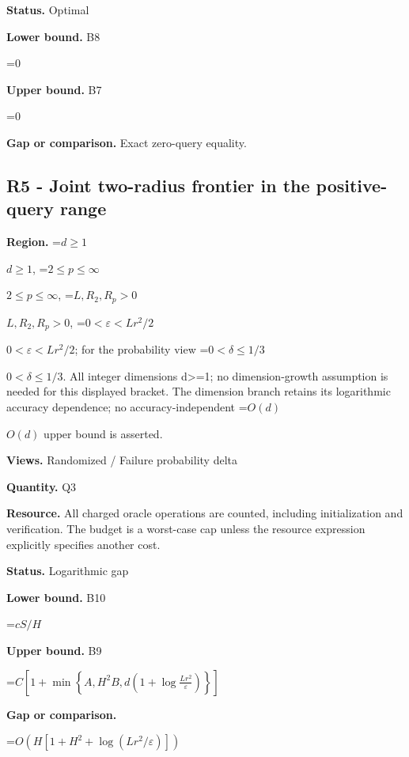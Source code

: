 \documentclass[10pt,a4paper]{article}
\newcommand{\AtlasMath}[1]{\par\begingroup\centering\setbox0=\hbox{$\displaystyle #1$}\ifdim\wd0>1.4\linewidth\typeout{ATLAS WIDE FORMULA: \the\wd0}\fi\ifdim\wd0>\linewidth\resizebox{\linewidth}{!}{\box0}\else\box0\fi\par\endgroup}
\newcommand{\AtlasInlineMath}[1]{\begingroup\setbox0=\hbox{$#1$}\ifdim\wd0>.4\linewidth\endgroup\AtlasMath{#1}\else\endgroup$#1$\fi}
\begin{document}
\textbf{Status.} Optimal



\textbf{Lower bound.} B8



\AtlasMath{0}


\textbf{Upper bound.} B7



\AtlasMath{0}


\textbf{Gap or comparison.} Exact zero-query equality.



\subsection{R5 - Joint two-radius frontier in the positive-query range}


\textbf{Region.} \AtlasInlineMath{d\ge1}, \AtlasInlineMath{2\le p\le\infty}, \AtlasInlineMath{L,R_2,R_p>0}, \AtlasInlineMath{0<\varepsilon<Lr^2/2}; for the probability view \AtlasInlineMath{0<\delta\le1/3}. All integer dimensions d>=1; no dimension-growth assumption is needed for this displayed bracket. The dimension branch retains its logarithmic accuracy dependence; no accuracy-independent \AtlasInlineMath{O(d)} upper bound is asserted.



\textbf{Views.} Randomized / Failure probability delta



\textbf{Quantity.} Q3



\textbf{Resource.} All charged oracle operations are counted, including initialization and verification. The budget is a worst-case cap unless the resource expression explicitly specifies another cost.



\textbf{Status.} Logarithmic gap



\textbf{Lower bound.} B10



\AtlasMath{cS/H}


\textbf{Upper bound.} B9



\AtlasMath{C\left[1+\min\left\{A,H^2B,d\left(1+\log\frac{Lr^2}{\varepsilon}\right)\right\}\right]}


\textbf{Gap or comparison.}



\AtlasMath{O\!\left(H[1+H^2+\log(Lr^2/\varepsilon)]\right)}
\end{document}
